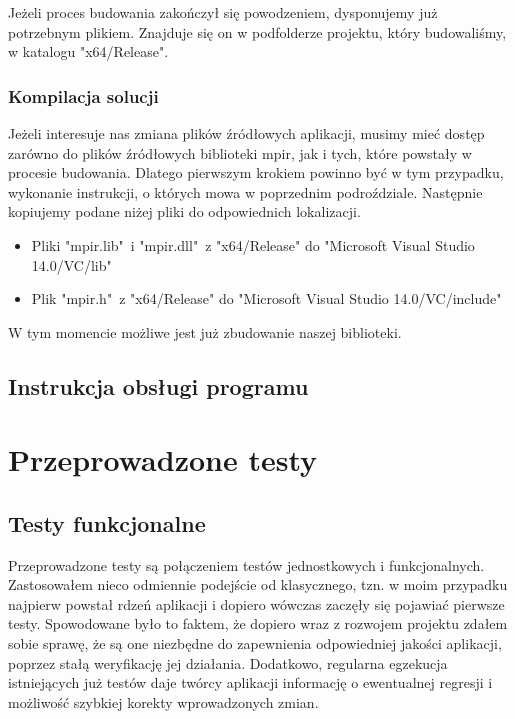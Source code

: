 \documentclass[oneside,a4paper]{book}
\begin{document}
	Jeżeli proces budowania zakończył się powodzeniem, dysponujemy już potrzebnym plikiem. Znajduje się on w podfolderze projektu, który budowaliśmy, w katalogu "x64/Release".
	
	\subsection{Kompilacja solucji}
	
	Jeżeli interesuje nas zmiana plików źródłowych aplikacji, musimy mieć dostęp zarówno do plików źródłowych biblioteki mpir, jak i tych, które powstały w procesie budowania. Dlatego pierwszym krokiem powinno być w tym przypadku, wykonanie instrukcji, o których mowa w poprzednim podroździale. Następnie kopiujemy podane niżej pliki do odpowiednich lokalizacji.
	
	\begin{itemize}
		\item Pliki "mpir.lib"\ i "mpir.dll"\ z "x64/Release" do "Microsoft Visual Studio 14.0/VC/lib"
		\item Plik "mpir.h"\ z "x64/Release" do "Microsoft Visual Studio 14.0/VC/include"
	\end{itemize}
	
	W tym momencie możliwe jest już zbudowanie naszej biblioteki. 
	
	
	\section{Instrukcja obsługi programu}
	
	
	
	\chapter{Przeprowadzone testy}
	
	\section{Testy funkcjonalne}
	
	Przeprowadzone testy są połączeniem testów jednostkowych i funkcjonalnych. Zastosowałem nieco odmiennie podejście od klasycznego, tzn. w moim przypadku najpierw powstał rdzeń aplikacji i dopiero wówczas zaczęły się pojawiać pierwsze testy. Spowodowane było to faktem, że dopiero wraz z rozwojem projektu zdałem sobie sprawę, że są one niezbędne do zapewnienia odpowiedniej jakości aplikacji, poprzez stałą weryfikację jej działania. Dodatkowo, regularna egzekucja istniejących już testów daje twórcy aplikacji informację o ewentualnej regresji i możliwość szybkiej korekty wprowadzonych zmian.
	
\end{document}
